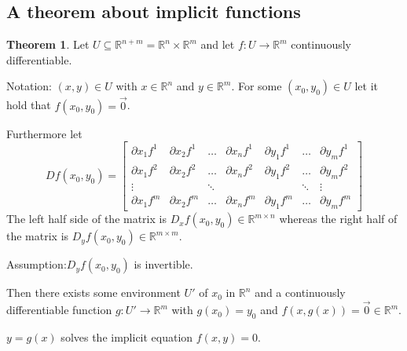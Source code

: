 \documentclass[a4paper,landscape,twocolumn]{article}
\theoremstyle{definition}
\newtheorem{theorem}{Theorem}
\begin{document}
\subsection{A theorem about implicit functions}
%
\begin{theorem}
  Let $U \subseteq \mathbb R^{n + m} = \mathbb R^n \times \mathbb R^m$ and let
  $f: U \to \mathbb R^m$ continuously differentiable.

  Notation: $(x,y) \in U$ with $x \in \mathbb R^n$ and $y \in \mathbb R^m$.
  For some $(x_0, y_0) \in U$ let it hold that $f(x_0, y_0) = \vec{0}$.

  Furthermore let
  \[
  Df(x_0, y_0) = \begin{bmatrix}
    \partial x_1 f^1 & \partial x_2 f^1 & \ldots & \partial x_n f^1 & \partial y_1 f^1 & \ldots & \partial y_m f^1 \\
    \partial x_1 f^2 & \partial x_2 f^2 & \ldots & \partial x_n f^2 & \partial y_1 f^2 & \ldots & \partial y_m f^2 \\
    \vdots           &                 & \ddots &                  &                 & \ddots & \vdots \\
    \partial x_1 f^m & \partial x_2 f^m & \ldots & \partial x_n f^m & \partial y_1 f^m & \ldots & \partial y_m f^m
    \end{bmatrix}
  \]
  The left half side of the matrix is $D_x f(x_0, y_0) \in \mathbb R^{m\times n}$ whereas the right half of the matrix
  is $D_yf(x_0, y_0) \in \mathbb R^{m\times m}$.

  Assumption:$D_y f(x_0, y_0)$ is invertible.

  Then there exists some environment $U'$ of $x_0$ in $\mathbb R^n$ and a continuously differentiable function
  $g: U' \to \mathbb R^m$ with $g(x_0) = y_0$ and $f(x, g(x)) = \vec{0} \in \mathbb R^m$.

  $y = g(x)$ solves the implicit equation $f(x,y) = 0$.
\end{theorem}
\end{document}
